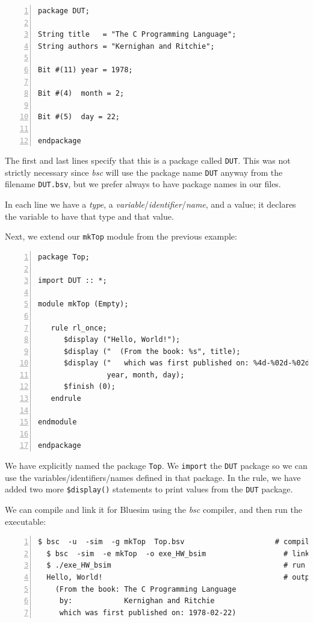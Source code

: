 {\footnotesize
\begin{Verbatim}[frame=single, numbers=left, label=in file Ex\_04\_02/DUT.bsv]
package DUT;

String title   = "The C Programming Language";
String authors = "Kernighan and Ritchie";

Bit #(11) year = 1978;

Bit #(4)  month = 2;

Bit #(5)  day = 22;

endpackage
\end{Verbatim}
}

The first and last lines specify that this is a package called
\verb|DUT|.  This was not strictly necessary since \emph{bsc} will use
the package name \verb|DUT| anyway from the filename \verb|DUT.bsv|,
but we prefer always to have package names in our files.

In each line we have a \emph{type}, a
\emph{variable}/\emph{identifier}/\emph{name}, and a value; it
declares the variable to have that type and that value.

Next, we extend our \verb|mkTop| module from the previous example:

{\footnotesize
\begin{Verbatim}[frame=single, numbers=left, label=in file Ex\_04\_02/Top.bsv]
package Top;

import DUT :: *;

module mkTop (Empty);

   rule rl_once;
      $display ("Hello, World!");
      $display ("  (From the book: %s", title);
      $display ("   which was first published on: %4d-%02d-%02d)",
                year, month, day);
      $finish (0);
   endrule

endmodule

endpackage
\end{Verbatim}
}

We have explicitly named the package \verb|Top|.  We \verb|import| the
\verb|DUT| package so we can use the variables/identifiers/names
defined in that package.  In the rule, we have added two more
\verb|$display()| statements to print values from the \verb|DUT|
package.

We can compile and link it for Bluesim using the \emph{bsc} compiler,
and then run the executable:

{\footnotesize
\begin{Verbatim}[frame=single, numbers=left]
  $ bsc  -u  -sim  -g mkTop  Top.bsv                     # compile
  $ bsc  -sim  -e mkTop  -o exe_HW_bsim                  # link
  $ ./exe_HW_bsim                                        # run
  Hello, World!                                          # output
    (From the book: The C Programming Language
     by:            Kernighan and Ritchie
     which was first published on: 1978-02-22)
\end{Verbatim}
}

